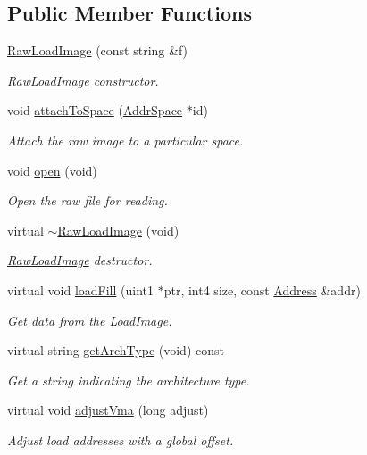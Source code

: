 \subsection*{Public Member Functions}
\begin{DoxyCompactItemize}
\item 
\mbox{\hyperlink{class_raw_load_image_aa3de896c28484086e22da165f678001f}{Raw\+Load\+Image}} (const string \&f)
\begin{DoxyCompactList}\small\item\em \mbox{\hyperlink{class_raw_load_image}{Raw\+Load\+Image}} constructor. \end{DoxyCompactList}\item 
void \mbox{\hyperlink{class_raw_load_image_aac15f96e10e57d6fba0466e7cc1ec9c3}{attach\+To\+Space}} (\mbox{\hyperlink{class_addr_space}{Addr\+Space}} $\ast$id)
\begin{DoxyCompactList}\small\item\em Attach the raw image to a particular space. \end{DoxyCompactList}\item 
void \mbox{\hyperlink{class_raw_load_image_a0863902d12aba3ca097aa8329b27d8e8}{open}} (void)
\begin{DoxyCompactList}\small\item\em Open the raw file for reading. \end{DoxyCompactList}\item 
virtual \mbox{\hyperlink{class_raw_load_image_ad7216066780c11564979f945e9068b08}{$\sim$\+Raw\+Load\+Image}} (void)
\begin{DoxyCompactList}\small\item\em \mbox{\hyperlink{class_raw_load_image}{Raw\+Load\+Image}} destructor. \end{DoxyCompactList}\item 
virtual void \mbox{\hyperlink{class_raw_load_image_ac66523f8d5e0533f4af6ee7bd48741cc}{load\+Fill}} (uint1 $\ast$ptr, int4 size, const \mbox{\hyperlink{class_address}{Address}} \&addr)
\begin{DoxyCompactList}\small\item\em Get data from the \mbox{\hyperlink{class_load_image}{Load\+Image}}. \end{DoxyCompactList}\item 
virtual string \mbox{\hyperlink{class_raw_load_image_af6696aae484080c76a2fd0b059aa27c8}{get\+Arch\+Type}} (void) const
\begin{DoxyCompactList}\small\item\em Get a string indicating the architecture type. \end{DoxyCompactList}\item 
virtual void \mbox{\hyperlink{class_raw_load_image_aee25cd14ca80ad47db0b17d56cc31180}{adjust\+Vma}} (long adjust)
\begin{DoxyCompactList}\small\item\em Adjust load addresses with a global offset. \end{DoxyCompactList}\end{DoxyCompactItemize}
